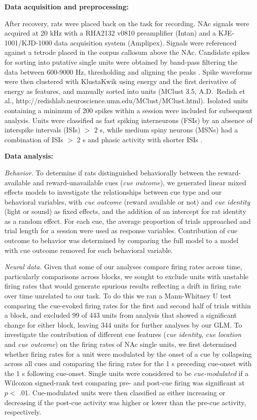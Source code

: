 \documentclass[11pt]{article}
\let\cite=\citep
\begin{document}
{\bf Data acquisition and preprocessing:}

After recovery, rats were placed back on the task for recording. NAc
signals were acquired at 20 kHz with a RHA2132 v0810 preamplifier
(Intan) and a KJE-1001/KJD-1000 data acquisition system
(Amplipex). Signals were referenced against a tetrode placed in the
corpus callosum above the NAc. Candidate spikes for sorting into
putative single units were obtained by band-pass filtering the data
between 600-9000 Hz, thresholding and aligning the peaks \cite[UltraMegaSort2k, ][]{Hill2011}. Spike waveforms were then
clustered with KlustaKwik using energy and the first derivative of
energy as features, and manually sorted into units (MClust 3.5,
A.D.\ Redish et al., http://redishlab.neuroscience.umn.edu/MClust/MClust.html). Isolated units containing a minimum of 200
spikes within a session were included for subsequent analysis. Units
were classified as fast spiking interneurons (FSIs) by an absence of
interspike intervals (ISIs) $>$ 2 s, while medium spiny neurons (MSNs)
had a combination of ISIs $>$ 2 s and phasic activity with shorter
ISIs \cite{Barnes2005,Atallah2014}.

{\bf Data analysis:}

{\it Behavior.} To determine if rats distinguished behaviorally
between the reward-available and reward-unavailable cues ({\it cue
outcome}), we generated linear mixed effects models to investigate
the relationships between cue type and our behavioral variables, with
{\it cue outcome} (reward available or not) and {\it cue identity}
(light or sound) as fixed effects, and the addition of an intercept
for rat identity as a random effect. For each cue, the average
proportion of trials approached and trial length for a session were
used as response variables. Contribution of cue outcome to behavior
was determined by comparing the full model to a model with cue outcome
removed for each behavioral variable.

{\it Neural data.} Given that some of our analyses compare firing rates across time,
particularly comparisons across blocks, we sought to exclude units
with unstable firing rates that would generate spurious results
reflecting a drift in firing rate over time unrelated to our task. To
do this we ran a Mann-Whitney U test comparing the cue-evoked firing
rates for the first and second half of trials within a block, and
excluded 99 of 443 units from analysis that showed a significant change for
either block, leaving 344 units for further analyses by our GLM. To investigate the contribution of different cue
features ({\it cue identity}, {\it cue location} and {\it cue outcome}) on the firing rates of NAc
single units, we first determined whether firing rates for a unit
were modulated by the onset of a cue by collapsing across all cues
and comparing the firing rates for the 1 s preceding cue-onset with
the 1 s following cue-onset. Single units were considered to be {\it
cue-modulated} if a Wilcoxon signed-rank test comparing pre- and
post-cue firing was significant at $p <$ .01. Cue-modulated units
were then classified as either increasing or decreasing if the
post-cue activity was higher or lower than the pre-cue activity,
respectively.
\end{document}
